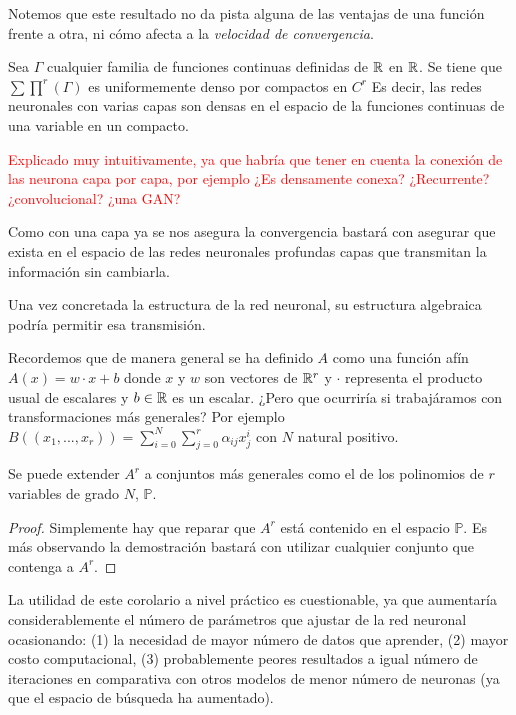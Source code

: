 Notemos que este resultado no da pista alguna de las ventajas de una función frente a otra,
 ni cómo afecta a la \textit{velocidad de convergencia}. 

\begin{corolario}

    Sea $\Gamma$ cualquier familia de funciones continuas definidas de $\mathbb{R}$ en $\mathbb{R}$. 
    Se tiene que $\sum \prod ^r (\Gamma)$ es uniformemente denso por compactos en $C^r$  
    Es decir, las redes neuronales con varias capas son densas en el  espacio de la funciones continuas de una variable en un compacto. 
\end{corolario}

    \textcolor{red}{Explicado muy intuitivamente, ya que habría que tener en cuenta la conexión de las neurona 
    capa por capa, por ejemplo ¿Es densamente conexa? ¿Recurrente? ¿convolucional? ¿una GAN?}

    Como con una capa ya se nos asegura la convergencia bastará con asegurar que exista 
    en el espacio de las redes neuronales profundas capas que transmitan la información sin cambiarla. 

    Una vez concretada la estructura de la red neuronal,  su estructura algebraica podría permitir esa transmisión. 


Recordemos que de manera general se ha definido $A$ como una función afín 
$A(x) = w \cdot x + b$ donde $x$ y $w$ son vectores de $\mathbb{R}^r$ y $\cdot$ representa el producto 
usual de escalares y $b \in \mathbb{R}$ es un escalar.  ¿Pero que ocurriría si trabajáramos con transformaciones más generales?  
Por ejemplo $B((x_1, ..., x_r)) = \sum_{i= 0} ^N \sum_{j= 0} ^r \alpha_{ij} x_j^i$  con $N$ natural positivo. 

\begin{corolario}[Generalización de A]  

    Se puede extender $A^r$ a conjuntos más generales como el de los polinomios de $r$ variables de grado $N$, $\mathbb{P}$.  
\end{corolario}
\begin{proof}
    Simplemente hay que reparar que $A^r$ está contenido en el espacio $\mathbb{P}$. 
    Es más observando la demostración bastará con utilizar cualquier conjunto que contenga a $A^r$. 
\end{proof}

La utilidad de este corolario a nivel práctico es cuestionable, ya que aumentaría considerablemente el número de 
parámetros que ajustar de la red neuronal ocasionando: (1) la necesidad de mayor número de datos que aprender, 
(2) mayor costo computacional, (3) probablemente peores resultados a igual número de iteraciones en comparativa 
con otros modelos de menor número de neuronas (ya que el espacio de búsqueda ha aumentado).

